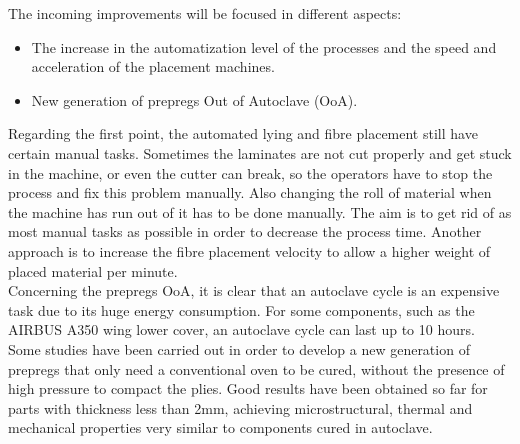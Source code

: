 The incoming improvements will be focused in different aspects:\\

\begin{itemize}
	\item The increase in the automatization level of the processes and the
	speed and acceleration of the placement machines.
	\item New generation of prepregs Out of Autoclave (OoA).
\end{itemize}

Regarding the first point, the automated lying and fibre placement still have
certain manual tasks. Sometimes the laminates are not cut properly and get stuck in
the machine, or even the cutter can break, so the operators have to stop the process
and fix this problem manually. Also changing the roll of material when the machine
has run out of it has to be done manually. The aim is to get rid of as most manual
tasks as possible in order to decrease the process time. Another approach is to
increase the fibre placement velocity to allow a higher weight of placed material
per minute.\\

Concerning the prepregs OoA, it is clear that an autoclave cycle is an
expensive task due to its huge energy consumption. For some components, such as
the AIRBUS A350 wing lower cover, an autoclave cycle can last up to 10 hours.
Some studies have been carried
out in order to develop a new generation of prepregs that only need a conventional
oven to be cured, without the presence of high pressure to compact the plies.
Good results have been
obtained so far for parts with thickness less than 2mm, achieving microstructural,
thermal and mechanical properties very similar to components cured in autoclave.\\
